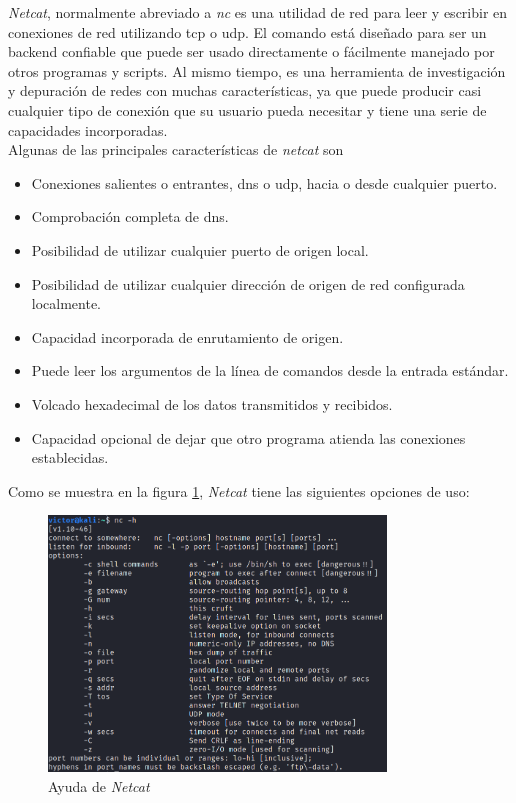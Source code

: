 \textit{Netcat}, normalmente abreviado a \textit{nc}\cite{netcat} es una utilidad de red para leer y escribir en conexiones de red utilizando \acrshort{tcp} o \acrshort{udp}. El comando está diseñado para ser un backend confiable que puede ser usado directamente o fácilmente manejado por otros programas y scripts. Al mismo tiempo, es una herramienta de investigación y depuración de redes con muchas características, ya que puede producir casi cualquier tipo de conexión que su usuario pueda necesitar y tiene una serie de capacidades incorporadas.\\

Algunas de las principales características de \textit{netcat} son
\begin{itemize}
    \item Conexiones salientes o entrantes, \acrshort{dns} o \acrshort{udp}, hacia o desde cualquier puerto.
    \item Comprobación completa de \acrshort{dns}.
    \item Posibilidad de utilizar cualquier puerto de origen local.
    \item Posibilidad de utilizar cualquier dirección de origen de red configurada localmente.
    \item Capacidad incorporada de enrutamiento de origen.
    \item Puede leer los argumentos de la línea de comandos desde la entrada estándar.
    \item Volcado hexadecimal de los datos transmitidos y recibidos.
    \item Capacidad opcional de dejar que otro programa atienda las conexiones establecidas.
\end{itemize}

Como se muestra en la figura \ref{fig:ayuda-nc}, \textit{Netcat} tiene las siguientes opciones de uso:
\begin{figure}[h]
    \centering
    \includegraphics[width=0.8\textwidth]{images/sections/tools/nc-help.png}
    \caption{Ayuda de \textit{Netcat}}
    \label{fig:ayuda-nc}
\end{figure}